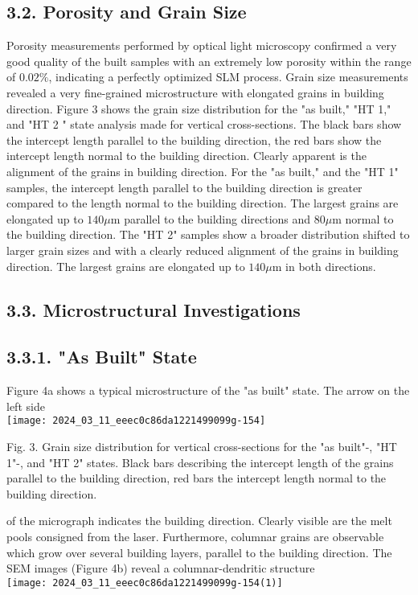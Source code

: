 \documentclass[10pt]{article}
\begin{document}
\subsection*{3.2. Porosity and Grain Size}
Porosity measurements performed by optical light microscopy confirmed a very good quality of the built samples with an extremely low porosity within the range of $0.02 \%$, indicating a perfectly optimized SLM process. Grain size measurements revealed a very fine-grained microstructure with elongated grains in building direction. Figure 3 shows the grain size distribution for the "as built," "HT 1," and "HT 2 " state analysis made for vertical cross-sections. The black bars show the intercept length parallel to the building direction, the red bars show the intercept length normal to the building direction. Clearly apparent is the alignment of the grains in building direction. For the "as built," and the "HT 1" samples, the intercept length parallel to the building direction is greater compared to the length normal to the building direction. The largest grains are elongated up to $140 \mu \mathrm{m}$ parallel to the building directions and $80 \mu \mathrm{m}$ normal to the building direction. The "HT 2" samples show a broader distribution shifted to larger grain sizes and with a clearly reduced alignment of the grains in building direction. The largest grains are elongated up to $140 \mu \mathrm{m}$ in both directions.

\subsection*{3.3. Microstructural Investigations}
\subsection*{3.3.1. "As Built" State}
Figure 4a shows a typical microstructure of the "as built" state. The arrow on the left side\\
\texttt{[image: 2024\_03\_11\_eeec0c86da1221499099g-154]}

Fig. 3. Grain size distribution for vertical cross-sections for the "as built"-, "HT 1"-, and "HT 2" states. Black bars describing the intercept length of the grains parallel to the building direction, red bars the intercept length normal to the building direction.

of the micrograph indicates the building direction. Clearly visible are the melt pools consigned from the laser. Furthermore, columnar grains are observable which grow over several building layers, parallel to the building direction. The SEM images (Figure 4b) reveal a columnar-dendritic structure\\
\texttt{[image: 2024\_03\_11\_eeec0c86da1221499099g-154(1)]}
\end{document}
